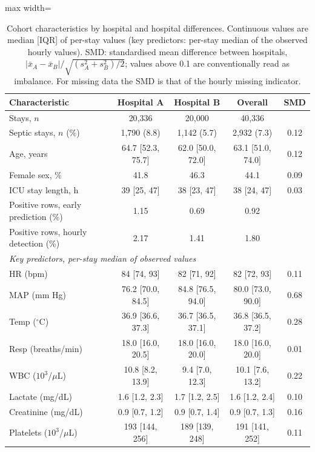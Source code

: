 \documentclass[preprint,12pt]{elsarticle}
\begin{document}
\begin{table}[!t]
\centering\footnotesize\setlength{\tabcolsep}{4pt}
\caption{Cohort characteristics by hospital and hospital differences. Continuous values are median [IQR] of per-stay values (key predictors: per-stay median of the observed hourly values). SMD: standardised mean difference between hospitals, $|\bar x_A-\bar x_B|/\sqrt{(s_A^2+s_B^2)/2}$; values above 0.1 are conventionally read as imbalance. For missing data the SMD is that of the hourly missing indicator.}
\label{tab:cohort}
\begin{adjustbox}{max width=\linewidth}
\begin{tabular}{lcccc}
\toprule
Characteristic & Hospital A & Hospital B & Overall & SMD \\
\midrule
Stays{,} $n$ & 20{,}336 & 20{,}000 & 40{,}336 & \\
Septic stays{,} $n$ (\%) & 1{,}790 (8.8) & 1{,}142 (5.7) & 2{,}932 (7.3) & 0.12 \\
Age, years & 64.7 [52.3, 75.7] & 62.0 [50.0, 72.0] & 63.1 [51.0, 74.0] & 0.12 \\
Female sex, \% & 41.8 & 46.3 & 44.1 & 0.09 \\
ICU stay length, h & 39 [25, 47] & 38 [23, 47] & 38 [24, 47] & 0.03 \\
Positive rows, early prediction (\%) & 1.15 & 0.69 & 0.92 & \\
Positive rows, hourly detection (\%) & 2.17 & 1.41 & 1.80 & \\
\midrule
\multicolumn{5}{l}{\emph{Key predictors, per-stay median of observed values}} \\
HR (bpm) & 84 [74, 93] & 82 [71, 92] & 82 [72, 93] & 0.11 \\
MAP (mm Hg) & 76.2 [70.0, 84.5] & 84.8 [76.5, 94.0] & 80.0 [73.0, 90.0] & 0.68 \\
Temp ($^\circ$C) & 36.9 [36.6, 37.3] & 36.7 [36.5, 37.1] & 36.8 [36.5, 37.2] & 0.28 \\
Resp (breaths/min) & 18.0 [16.0, 20.5] & 18.0 [16.0, 20.0] & 18.0 [16.0, 20.0] & 0.01 \\
WBC ($10^3$/$\mu$L) & 10.8 [8.2, 13.9] & 9.4 [7.0, 12.3] & 10.1 [7.6, 13.2] & 0.22 \\
Lactate (mg/dL) & 1.6 [1.2, 2.3] & 1.7 [1.2, 2.5] & 1.6 [1.2, 2.4] & 0.10 \\
Creatinine (mg/dL) & 0.9 [0.7, 1.2] & 0.9 [0.7, 1.4] & 0.9 [0.7, 1.3] & 0.16 \\
Platelets ($10^3$/$\mu$L) & 193 [144, 256] & 189 [139, 248] & 191 [141, 252] & 0.11 \\

\end{tabular}
\end{adjustbox}
\end{table}
\end{document}
